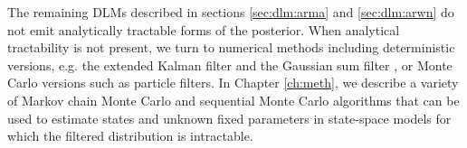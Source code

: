 The remaining DLMs described in sections \ref{sec:dlm:arma} and \ref{sec:dlm:arwn} do not emit analytically tractable forms of the posterior. When analytical tractability is not present, we turn to numerical methods including deterministic versions, e.g. the extended Kalman filter \cite[Sec 1.6][]{hay:2001:kal} and the Gaussian sum filter \citep{Alsp:Sore:nonl:1972}, or Monte Carlo versions such as particle filters. In Chapter \ref{ch:meth}, we describe a variety of Markov chain Monte Carlo and sequential Monte Carlo algorithms that can be used to estimate states and unknown fixed parameters in state-space models for which the filtered distribution is intractable. 